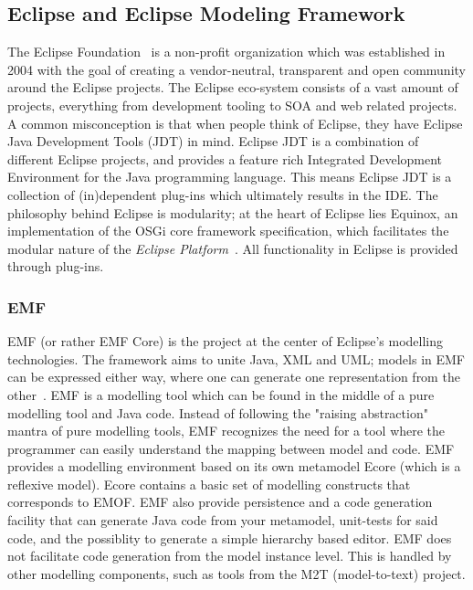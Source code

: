 \subsection{Eclipse and Eclipse Modeling Framework}
The Eclipse Foundation~\cite{Eclipse} is a non-profit organization which was established in 2004 with the goal of creating a vendor-neutral, transparent and open community around the Eclipse projects. The Eclipse eco-system consists of a vast amount of projects, everything from development tooling to SOA and web related projects. A common misconception is that when people think of Eclipse, they have Eclipse Java Development Tools (JDT) in mind. Eclipse JDT is a combination of different Eclipse projects, and provides a feature rich Integrated Development Environment for the Java programming language. This means Eclipse JDT is a collection of (in)dependent plug-ins which ultimately results in the IDE. The philosophy behind Eclipse is modularity; at the heart of Eclipse lies Equinox, an implementation of the OSGi core framework specification, which facilitates the modular nature of the \emph{Eclipse Platform}~\cite{eclipse_whitepaper}. All functionality in Eclipse is provided through plug-ins.

\subsubsection{EMF} \label{subsub:emf}
EMF (or rather EMF Core) is the project at the center of Eclipse's modelling technologies. The framework aims to unite Java, XML and UML; models in EMF can be expressed either way, where one can generate one representation from the other~\cite{BudinskyMerksS06}. EMF is a modelling tool which can be found in the middle of a pure modelling tool and Java code. Instead of following the "raising abstraction" mantra of pure modelling tools, EMF recognizes the need for a tool where the programmer can easily understand the mapping between model and code. EMF provides a modelling environment based on its own metamodel Ecore (which is a reflexive model). Ecore contains a basic set of modelling constructs that corresponds to EMOF. EMF also provide persistence and a code generation facility that can generate Java code from your metamodel, unit-tests for said code, and the possiblity to generate a simple hierarchy based editor. EMF does not facilitate code generation from the model instance level. This is handled by other modelling components, such as tools from the M2T (model-to-text) project.

